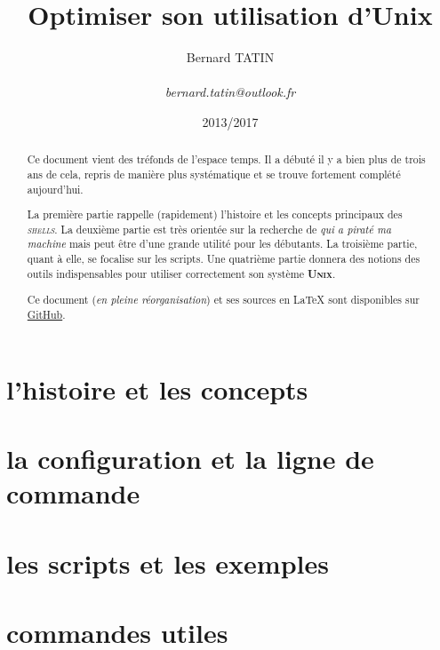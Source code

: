 \documentclass[12pt]{amsproc} %
\title{Optimiser son utilisation d'Unix}
\author{Bernard TATIN \\
\tiny \\
\textit{bernard.tatin@outlook.fr}}
\date{2013/2017} %
\makeatletter
\newcommand\osname[1]{\textsc{\textbf{#1}}\index{#1@\textsc{#1}}\xspace}
\newcommand\unix{\osname{Unix}}
\newcommand\shells{\emph{\textsc{shells}}\xspace{}}
\makeatother
\begin{document}
 \begin{abstract}
 Ce document vient des tréfonds de l'espace temps. Il a débuté il y a bien plus de trois ans de cela, repris de manière plus systématique et se trouve fortement complété aujourd'hui.

 La première partie rappelle (rapidement) l'histoire et les concepts principaux des \shells{}.
 La deuxième partie est très orientée sur la recherche de \emph{qui a piraté ma machine} mais peut être
 d'une grande utilité pour les débutants. La troisième partie, quant à elle, se focalise sur les scripts.
 Une quatrième partie donnera des notions des outils indispensables pour utiliser correctement son système \unix{}.

 Ce document (\emph{en pleine réorganisation}) et ses sources en \LaTeX{} sont disponibles sur \href{https://github.com/BernardTatin/optimize-unix}{GitHub}.
 \end{abstract}
\maketitle
\tableofcontents

\part{l'histoire et les concepts}


\part{la configuration et la ligne de commande}


\part{les scripts et les exemples}


\part{commandes utiles}



\printindex
\end{document}

